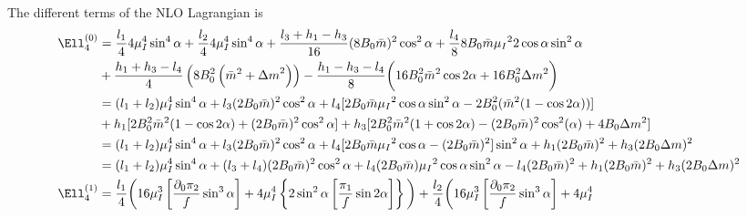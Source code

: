 \documentclass{article}
\begin{document}
The different terms of the NLO Lagrangian is
\begin{align*}
    \Ell_4^{(0)} & =
    \frac{l_1}{4} 4 \mu_I^4 \sin^4{\alpha}
    + \frac{l_2}{4}  4 \mu_I^4 \sin^4{\alpha}
    + \frac{l_3 + h_1 - h_3}{16} (8 B_0 \bar m)^2 \cos^2{\alpha}
    + \frac{l_4}{8} 8 B_0 \bar m \mu_I{}^2 2\cos{\alpha}\sin^2{\alpha} \\
    & 
    + \frac{h_1 + h_3 - l_4}{4} \left( 8B_0^2\left( {\bar m}^2 + {\Delta m}^2\right)\right)
    - \frac{h_1 - h_3 - l_4}{8}
    \bigg(
        16 B_0^2 \bar m^2 \cos{2\alpha} 
        + 16 B_0^2 \Delta m^2
    \bigg) \\
    & = 
    (l_1 + l_2)\mu_I^4 \sin^4{\alpha}
    + l_3 (2 B_0 \bar m)^2 \cos^2{\alpha}
    + l_4
    [
        2 B_0 \bar m \mu_I{}^2 \cos{\alpha}\sin^2{\alpha}
        - 2 B_0^2
        (\bar m^2 (1 - \cos 2 \alpha )) 
    ]
    \\
    & 
    + h_1
        [
            2 B_0^2 \bar m^2(1 - \cos 2 \alpha)
            + (2 B_0 \bar m)^2 \cos^2\alpha
        ]
    + h_3
        [
            2 B_0^2 \bar m^2(1 + \cos 2 \alpha) 
            - (2 B_0 \bar m)^2 \cos^2(\alpha)
            + 4 B_0 \Delta m^2
        ]
    \\
    & =
    (l_1 + l_2)\mu_I^4 \sin^4{\alpha}
    + l_3 (2 B_0 \bar m)^2 \cos^2{\alpha}
    + l_4 
    [
        2 B_0 \bar m \mu_I{}^2 \cos{\alpha}
        -
        (2 B_0\bar m) ^2
    ] \sin^2{\alpha}
    + h_1 (2B_0 \bar m)^2
    + h_3 (2B_0 \Delta m)^2
    \\
    & =
    (l_1 + l_2)\mu_I^4 \sin^4{\alpha}
    + (l_3 + l_4)(2 B_0 \bar m)^2 \cos^2{\alpha}
    + l_4 (2 B_0 \bar m ) \mu_I{}^2 \cos{\alpha} \sin^2{\alpha}
    - l_4 (2B_0 \bar m )^2
    + h_1 (2B_0 \bar m)^2
    + h_3 (2B_0 \Delta m)^2
    \\
    \Ell_4^{(1)} & =
    \frac{l_1}{4} 
    \bigg(
        16 \mu_I^3 
        \left[
            \frac{\partial_0 \pi_2}{f}\sin^3{\alpha}
        \right]
    + 4 \mu_I^4 
        \left\{
            2 \sin^2{\alpha}
            \left[
                \frac{\pi_1}{f}\sin{2\alpha}
            \right]
        \right\}
    \bigg)
    + \frac{l_2}{4} 
    \bigg(
        16 \mu_I^3 
        \left[
            \frac{\partial_0 \pi_2}{f} \sin^3{\alpha}
        \right] 
    + 4 \mu_I^4 

\end{align*}
\end{document}
